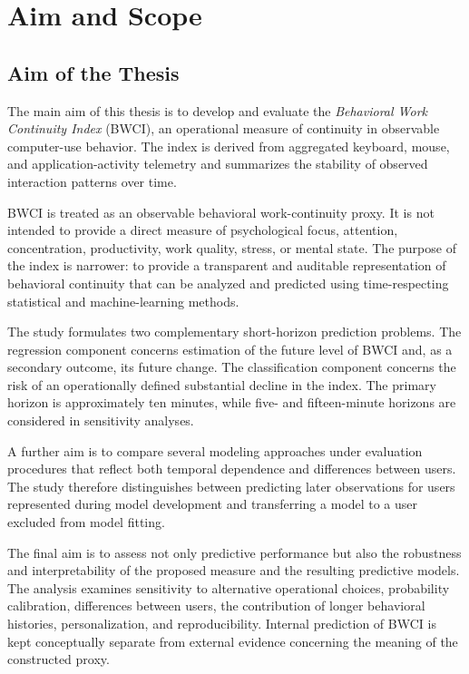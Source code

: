 \chapter{Aim and Scope}
\label{chap:aim-and-scope}

\section{Aim of the Thesis}

The main aim of this thesis is to develop and evaluate the \emph{Behavioral Work Continuity Index} (BWCI), an operational measure of continuity in observable computer-use behavior. The index is derived from aggregated keyboard, mouse, and application-activity telemetry and summarizes the stability of observed interaction patterns over time.

BWCI is treated as an observable behavioral work-continuity proxy. It is not intended to provide a direct measure of psychological focus, attention, concentration, productivity, work quality, stress, or mental state. The purpose of the index is narrower: to provide a transparent and auditable representation of behavioral continuity that can be analyzed and predicted using time-respecting statistical and machine-learning methods.

The study formulates two complementary short-horizon prediction problems.
The regression component concerns estimation of the future level of BWCI and, as a secondary outcome, its future change. The classification component concerns the risk of an operationally defined substantial decline in the index. The primary horizon is approximately ten minutes, while five- and fifteen-minute horizons are considered in sensitivity analyses.

A further aim is to compare several modeling approaches under evaluation procedures that reflect both temporal dependence and differences between users. The study therefore distinguishes between predicting later observations for users represented during model development and transferring a model to a user excluded from model fitting.

The final aim is to assess not only predictive performance but also the robustness and interpretability of the proposed measure and the resulting predictive models. The analysis examines sensitivity to alternative operational choices, probability calibration, differences between users, the contribution of longer behavioral histories, personalization, and reproducibility. Internal prediction of BWCI is kept conceptually separate from external evidence concerning the meaning of the constructed proxy.

